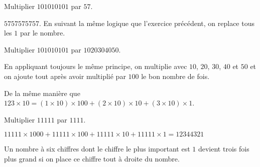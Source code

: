 \documentclass[fleqn,a4paper,nobib]{tufte-handout}
\begin{document}
\begin{exercise}
    Multiplier $101010101$ par $57$.
\end{exercise}

\begin{solution}
    \(5757575757\). En suivant la même logique que l'exercice
    précédent, on replace tous les $1$ par le nombre.
\end{solution}




\begin{exercise}
    Multiplier \(101010101\) par \(1020304050\).    
\end{exercise}

\begin{solution}
    En appliquant toujours le même principe, on multiplie
    avec $10$, \(20\), \(30\), \(40\) et \(50\) et on 
    ajoute tout après avoir multiplié par $100$ le bon nombre
    de fois.

    De la même manière que $123\times10 = (1\times10)\times100 + (2\times10)\times10 + (3\times10)\times1$.

\end{solution}






\begin{exercise}
    Multiplier $11111$ par $1111$.
\end{exercise}

\begin{solution}
    $11111\times1000 + 11111\times100 + 11111\times10
    + 11111\times1
    = 12344321$

\end{solution}







\begin{exercise}
    Un nombre à six chiffres dont le chiffre le plus
    important est $1$ devient trois fois plus grand
    si on place ce chiffre tout à droite du nombre.
\end{exercise}
\end{document}

